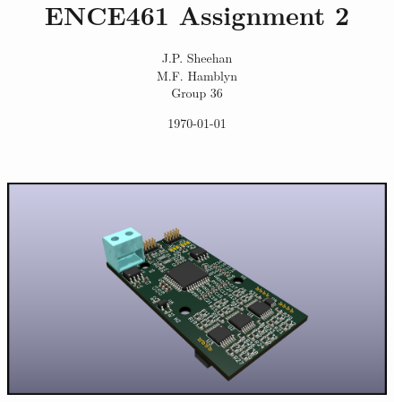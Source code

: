 \documentclass[12pt]{article}
\title{ENCE461 Assignment 2}
\author{
	J.P. Sheehan \\
	M.F. Hamblyn \\
	\small{Group 36}
}
\date{\today}
\begin{document}
\maketitle
\thispagestyle{empty}

\vfill
\begin{figure}[H]
	\centering
	\includegraphics[width=\textwidth]{render}
	\label{fig:render}
\end{figure}
\vfill

\newpage






\printbibliography


\end{document}
